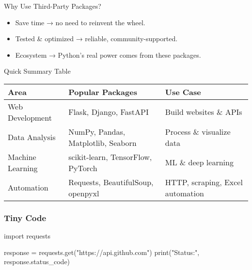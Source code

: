 \documentclass[
  letterpaper,
  DIV=11,
  numbers=noendperiod]{scrreprt}
\newenvironment{Shaded}{\begin{snugshade}}{\end{snugshade}}
\newcommand{\BuiltInTok}[1]{\textcolor[rgb]{0.00,0.23,0.31}{#1}}
\newcommand{\ImportTok}[1]{\textcolor[rgb]{0.00,0.46,0.62}{#1}}
\newcommand{\NormalTok}[1]{\textcolor[rgb]{0.00,0.23,0.31}{#1}}
\newcommand{\OperatorTok}[1]{\textcolor[rgb]{0.37,0.37,0.37}{#1}}
\newcommand{\StringTok}[1]{\textcolor[rgb]{0.13,0.47,0.30}{#1}}
\providecommand{\tightlist}{%
  \setlength{\itemsep}{0pt}\setlength{\parskip}{0pt}}
\begin{document}
Why Use Third-Party Packages?

\begin{itemize}
\tightlist
\item
  Save time → no need to reinvent the wheel.
\item
  Tested \& optimized → reliable, community-supported.
\item
  Ecosystem → Python's real power comes from these packages.
\end{itemize}

Quick Summary Table

\begin{longtable}[]{@{}
  >{\raggedright\arraybackslash}p{}
  >{\raggedright\arraybackslash}p{}
  >{\raggedright\arraybackslash}p{}@{}}
\toprule\noalign{}
\begin{minipage}[b]{\linewidth}\raggedright
Area
\end{minipage} & \begin{minipage}[b]{\linewidth}\raggedright
Popular Packages
\end{minipage} & \begin{minipage}[b]{\linewidth}\raggedright
Use Case
\end{minipage} \\
\midrule\noalign{}
\endhead
\bottomrule\noalign{}
\endlastfoot
Web Development & Flask, Django, FastAPI & Build websites \& APIs \\
Data Analysis & NumPy, Pandas, Matplotlib, Seaborn & Process \&
visualize data \\
Machine Learning & scikit-learn, TensorFlow, PyTorch & ML \& deep
learning \\
Automation & Requests, BeautifulSoup, openpyxl & HTTP, scraping, Excel
automation \\
\end{longtable}

\subsubsection{Tiny Code}\label{tiny-code-49}

\begin{Shaded}
\begin{Highlighting}[]
\ImportTok{import}\NormalTok{ requests}

\NormalTok{response }\OperatorTok{=}\NormalTok{ requests.get(}\StringTok{"https://api.github.com"}\NormalTok{)}
\BuiltInTok{print}\NormalTok{(}\StringTok{"Status:"}\NormalTok{, response.status\_code)}
\end{Highlighting}
\end{Shaded}
\end{document}

